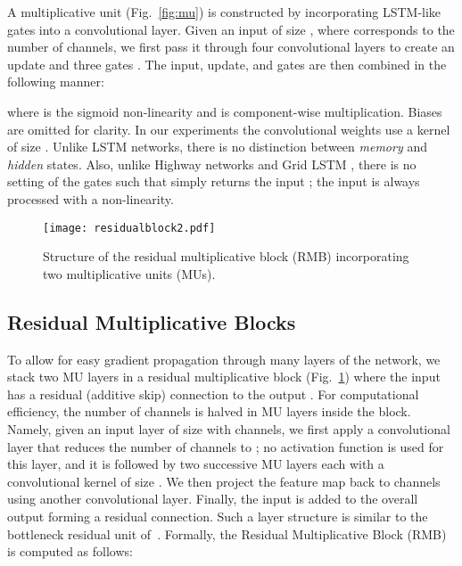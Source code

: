\documentclass{article}
\newcommand{\figref}[1]{Fig.~\ref{#1}}
\begin{document}
A multiplicative unit (\figref{fig:mu}) is constructed by incorporating LSTM-like gates into a convolutional layer.
Given an input  of size , where  corresponds to the number of channels, we first pass it through four convolutional layers to create an update  and three gates . The input, update, and gates are then combined in the following manner:



where  is the sigmoid non-linearity and  is component-wise multiplication. Biases are omitted for clarity.
In our experiments the convolutional weights  use a kernel of size .
Unlike LSTM networks, there is no distinction between \emph{memory} and \emph{hidden} states. 
Also, unlike Highway networks \citep{DBLP:journals/corr/SrivastavaGS15} and Grid LSTM \citep{DBLP:journals/corr/KalchbrennerDG15}, there is no setting of the gates such that  simply returns the input ; the input is always processed with a non-linearity.


\begin{figure}[t]
\vspace{-0.5cm}
\centering
\texttt{[image: residualblock2.pdf]}\caption{Structure of the residual multiplicative block (RMB) incorporating two multiplicative units (MUs).}
\label{fig:rmb}
\end{figure}




\subsection{Residual Multiplicative Blocks}
\label{sec:rmb}
To allow for easy gradient propagation through many layers of the network, we stack two MU layers in a residual multiplicative block (\figref{fig:rmb}) where the input has a residual (additive skip) connection to the output \citep{DBLP:journals/corr/HeZR016}. For computational efficiency, the number of channels is halved in MU layers inside the block.
Namely, given an input layer  of size  with  channels, we first apply a  convolutional layer that reduces the number of channels to ;
no activation function is used for this layer, and it is followed by two successive MU layers each with a convolutional kernel of size . 
We then project the feature map back to  channels using another  convolutional layer. Finally, the input  is added to the overall output forming a residual connection.
Such a layer structure is similar to the bottleneck residual unit of~\citep{DBLP:journals/corr/HeZR016}.
Formally, the Residual Multiplicative Block (RMB) is computed as follows:
\end{document}
